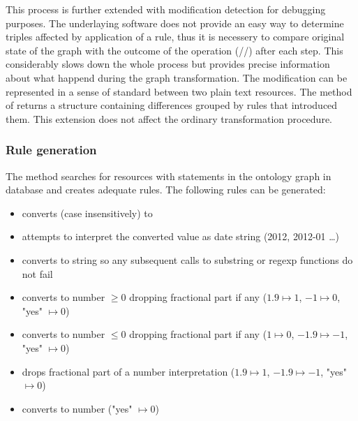 This process is further extended with modification detection for debugging purposes. The underlaying software does not provide an easy way to determine triples affected by application of a rule, thus it is necessery to compare original state of the graph with the outcome of the operation (//) after each step. This considerably slows down the whole process but provides precise information about what happend during the graph transformation. The modification can be represented in a sense of standard  between two plain text resources. The method  of  returns a  structure containing differences grouped by rules that introduced them. This extension does not affect the ordinary transformation procedure.

\subsubsection*{Rule generation}

The method  searches for resources with  statements in the ontology graph in database and creates adequate rules. The following rules can be generated:

\begin{itemize}
	\item {}
	
	converts  (case insensitively) to 
	
	\item {}
	
	attempts to interpret the converted value as date string (2012, 2012-01 \ldots)
	
	\item {}
	
	converts to string so any subsequent calls to substring or regexp functions do not fail

	\item {}
	
	converts to number $\ge 0$ dropping fractional part if any ($1.9 \mapsto 1$, $-1 \mapsto 0$, "yes" $\mapsto 0$)

	\item {}
	
	converts to number $\le 0$ dropping fractional part if any ($1 \mapsto 0$, $-1.9 \mapsto -1$, "yes" $\mapsto 0$)

	\item {}

	drops fractional part of a number interpretation ($1.9 \mapsto 1$, $-1.9 \mapsto -1$, "yes" $\mapsto 0$)

	\item {}

	converts to number ("yes" $\mapsto 0$)
\end{itemize}

